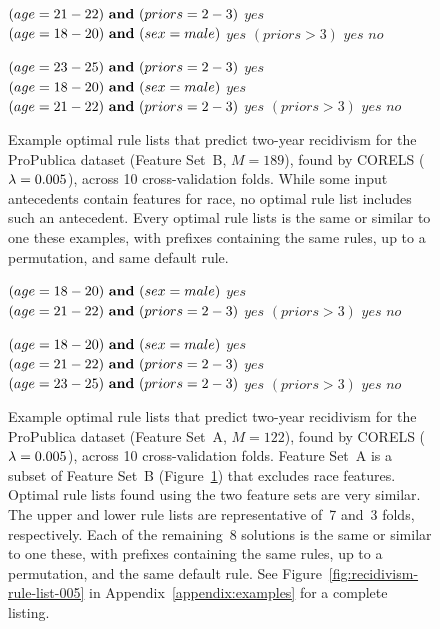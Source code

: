 %
\begin{figure}[t!]
\begin{algorithmic}
\State \bif $(age = 21-22) {\bf ~and~} (priors = 2-3)$ \bthen $yes$
\State \belif $(age = 18-20){\bf ~and~} (sex = male)$ \bthen $yes$
\State \belif $(priors > 3)$ \bthen $yes$
\State \belse $no$
\end{algorithmic}
\vspace{1mm}
\begin{algorithmic}
\State \bif $(age = 23-25) {\bf ~and~} (priors = 2-3)$ \bthen $yes$
\State \belif $(age = 18-20){\bf ~and~} (sex = male)$ \bthen $yes$
\State \belif $(age = 21-22) {\bf ~and~} (priors = 2-3)$ \bthen $yes$
\State \belif $(priors > 3)$ \bthen $yes$
\State \belse $no$
\end{algorithmic}
\caption{Example optimal rule lists that predict two-year recidivism for the
ProPublica dataset (Feature Set~B, ${M=189}$), found by CORELS (${{\lambda} = 0.005}$), across 10 cross-validation folds.
%
While some input antecedents contain features for race, no optimal rule list includes such an antecedent.
%
%
Every optimal rule lists is the same or similar to one these examples,
with prefixes containing the same rules, up to a permutation, and same default rule.
}
\label{fig:propublica}
\end{figure}
%
\begin{figure}[ht!]
\vspace{2mm}
\begin{algorithmic}
\State \bif $(age = 18-20) {\bf ~and~} (sex = male)$ \bthen $yes$
\State \belif $(age = 21-22) {\bf ~and~} (priors = 2-3)$ \bthen $yes$
\State \belif $(priors > 3)$ \bthen $yes$
\State \belse $no$
\end{algorithmic}
\vspace{1mm}
\begin{algorithmic}
\State \bif $(age = 18-20) {\bf ~and~} (sex = male)$ \bthen $yes$
\State \belif $(age = 21-22) {\bf ~and~} (priors = 2-3)$ \bthen $yes$
\State \belif $(age = 23-25) {\bf ~and~} (priors = 2-3)$ \bthen $yes$
\State \belif $(priors > 3)$ \bthen $yes$
\State \belse $no$
\end{algorithmic}
\caption{Example optimal rule lists that predict two-year recidivism for the
ProPublica dataset (Feature Set~A, ${M=122}$), found by CORELS (${{\lambda} = 0.005}$), across 10 cross-validation folds.
%
Feature Set~A is a subset of Feature Set~B (Figure~\ref{fig:propublica}) that excludes race features.
%
Optimal rule lists found using the two feature sets are very similar.
%
The upper and lower rule lists are representative of~7 and~3 folds, respectively.
%
Each of the remaining~8 solutions is the same or similar to one these,
with prefixes containing the same rules, up to a permutation, and the same default rule.
%
See Figure~\ref{fig:recidivism-rule-list-005} in Appendix~\ref{appendix:examples} for a complete listing.
}
\label{fig:recidivism-all-folds}
\end{figure}
